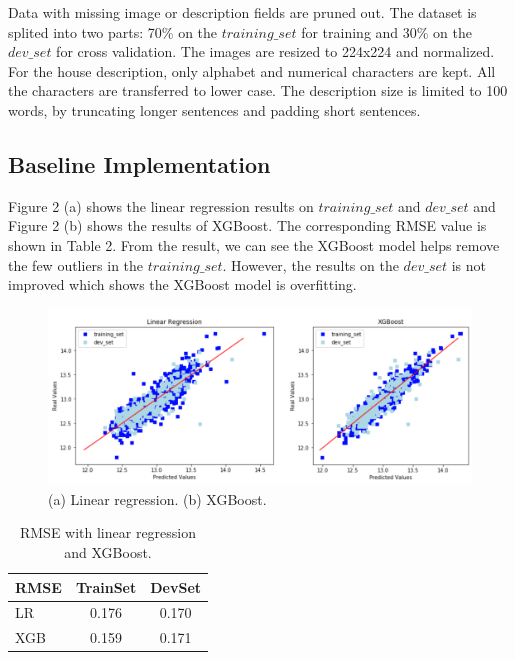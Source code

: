 \documentclass{article} %
\begin{document}
Data with missing image or description fields are pruned out.
The dataset is splited into two parts: 70\% on the $training\_set$ for training
and 30\% on the $dev\_set$ for cross validation.
The images are resized to 224x224 and normalized.
For the house description, only alphabet and numerical characters are kept.
All the characters are transferred to lower case.
The description size is limited to 100 words, 
by truncating longer sentences and padding short sentences.

\subsection{Baseline Implementation}

Figure 2 (a) shows the linear regression results \cite{lr} on $training\_set$ and $dev\_set$
and Figure 2 (b) shows the results of XGBoost\cite{xgboost}.
The corresponding RMSE value is shown in Table 2.
From the result, we can see the XGBoost model helps remove the few outliers in the $training\_set$.
However, the results on the $dev\_set$ is not improved which shows the XGBoost model is overfitting.

\begin{figure}[h]
	\begin{center}
		\includegraphics[width=1\linewidth]{fig/exp.png}
	\end{center}
	\caption{(a) Linear regression. (b) XGBoost.}
	\label{fig:long}
	\label{fig:onecol}
\end{figure}

\begin{table}[h]
	\begin{center}
		\begin{tabular}{|l|cc|}
			\hline
			RMSE &
			TrainSet &
			DevSet \\
			\hline
			LR & 0.176 & 0.170 \\
			\hline
			XGB & 0.159 & 0.171 \\
			\hline
		\end{tabular}
	\end{center}
	\caption{RMSE with linear regression and XGBoost.}
\end{table}
\end{document}
